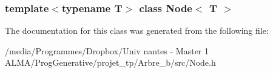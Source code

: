 \subsubsection*{template$<$typename T$>$ class Node$<$ T $>$}



The documentation for this class was generated from the following file:\begin{DoxyCompactItemize}
\item 
/media/Programmes/Dropbox/Univ nantes -\/ Master 1 ALMA/ProgGenerative/projet\_\-tp/Arbre\_\-b/src/Node.h\end{DoxyCompactItemize}
